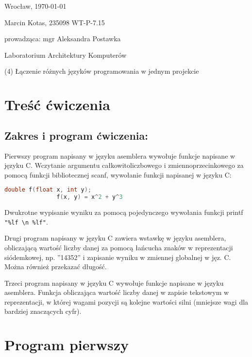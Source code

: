 \documentclass[polish, 11pt]{article}
\begin{document}
	\begin{flushright}
		Wrocław, \today
	\end{flushright}
	
	Marcin Kotas, 235098
	WT-P-7.15
	
	\begin{flushright}
		prowadząca: mgr Aleksandra Postawka
	\end{flushright}
	
	\begin{center}
		Laboratorium Architektury Komputerów
	
		(4)	Łączenie różnych języków programowania w jednym projekcie
	\end{center}
	
	\vspace{8cm}

\section{Treść ćwiczenia}
	\subsection*{Zakres i program ćwiczenia:}
		Pierwszy program napisany w języku asemblera wywołuje funkcje napisane w języku C.
		Wczytanie argumentu całkowitoliczbowego i zmiennoprzecinkowego za pomocą funkcji bibliotecznej scanf,
		wywołanie funkcji napisanej w języku C:
		\begin{lstlisting}[language=C,frame=none,gobble=12]
			double f(float x, int y);
			   f(x, y) = x^2 + y^3
		\end{lstlisting}
		Dwukrotne wypisanie wyniku za pomocą pojedynczego wywołania funkcji printf \verb|"%lf \n %lf"|.

		Drugi program napisany w języku C zawiera wstawkę w języku asemblera,
		obliczającą wartość liczby danej za pomocą łańcucha znaków w reprezentacji siódemkowej,
		np. ''14352'' i zapisanie wyniku w zmiennej globalnej w jęz. C. Można również przekazać długość.
		
		Trzeci program napisany w języku C wywołuje funkcje napisane w języku asemblera.
		Funkcja obliczająca wartość liczby danej w zapisie tekstowym w reprezentacji,
		w której wagami pozycji są kolejne wartości silni (mniejsze wagi dla bardziej znaczących cyfr).

\newpage
\section{Program pierwszy}
\end{document}
